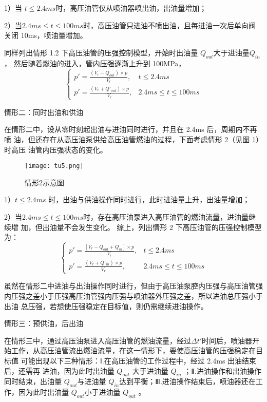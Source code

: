 \documentclass{cumcmthesis}
\begin{document}
1）当 $t\le 2.4ms$时，高压油管仅从喷油器喷出油，出油量增加； 

2）当$2.4ms\leq t\le 100ms$时，高压油管只进油不喷出油，且每进油一次后单向阀关闭 10ms，喷油量增加。 

同样列出情形 1.2 下高压油管的压强控制模型，开始时出油量 $Q_{out}$大于进油量$Q_{in}$ ， 然后随着燃油的进入，管内压强逐渐上升到 100MPa， 
\begin{equation}
\begin{cases}
p'=\frac{\left(V_{r}-Q_{out}\right)\times p}{V_{r}},&t\le 2.4ms\\
p'=\frac{\left(V_{r}+Q'_{out}\right)\times p}{V_{r}},&2.4ms\leq t\le 100ms
\end{cases}\label{eq:9}
\end{equation}


{\heiti 情形二：同时出油和供油}

在情形二中，设从零时刻起出油与进油同时进行，并且在 2.4ms 后，周期内不再喷 油，但还存在从高压油泵供给高压油管燃油的过程，下面考虑情形 2（见图 \ref{fig:5}）时高压 油管内压强状态的变化。 
\begin{figure}[htb] \centering 
	
	\texttt{[image: tu5.png]} 
	
	\caption{情形2示意图 } \label{fig:5} \end{figure} 

1）$t\le2.4ms$ 时，出油与供油操作同时进行，此时进油量上升，出油量增加； 

2）当$2.4ms\leq t\le100ms$时，存在高压油泵进入高压油管的燃油流量，进油量继续增 加，但出油量不会发生变化。 综上，列出情形 2 下高压油管的压强控制模型为：
\begin{equation}
\begin{cases}
p'=\frac{\left[V_{r}-Q_{out}+Q_{in}\right]\times p}{V_{r}},&t\le 2.4ms\\
p'=\frac{\left(V_{r}+Q'_{in}\right)\times p}{V_{r}},&2.4ms\leq t\le 100ms
\end{cases}\label{eq:10}
\end{equation}

虽然在情形二中进油与出油操作同时进行，但由于高压油泵腔内压强与高压油管强 内压强之差小于压强高压油管强内压强与喷油器外压强之差，所以进油总压强小于出油 总压强，若想使压强稳定在目标值，则仍需继续进油操作。

{\heiti 情形三：预供油，后出油} 

在情形三中，通过高压油泵进入高压油管的燃油流量，经过$\Delta t'$时间后，喷油器开 始工作，从高压油管流出燃油流量，在这一情形下，要使高压油管的压强稳定在目标值 可能出现以下三种情形：Ⅰ.在高压油管的工作过程中，经过 2.4ms 出油结束后，还需再 进油，因为此时出油量 $Q_{out}$ 大于进油量 $Q_{in}$ ；Ⅱ.进油操作和出油操作同时结束，出油量 $Q_{out}$与进油量 $Q_{in}$达到平衡；Ⅲ.进油操作结束后，喷油器还在工作，因为此时出油量 $Q_{out}$小于进油量 $Q_{out}$ 。 
\end{document}
